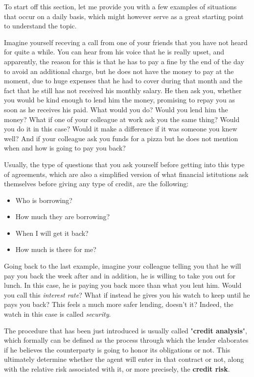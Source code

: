 \documentclass[a4paper,12pt]{article}
\begin{document}
        To start off this section, let me provide you with a few examples of situations that occur on a daily basis, which
        might however serve as a great starting point to understand the topic. 
    
        Imagine yourself receving a call from one of your friends that you have not heard for quite a while. 
        You can hear from his voice that he is really upset, and apparently, the reason for this is that he has to pay a fine 
        by the end of the day to avoid an additional charge, but he does not have the money to pay at the moment, 
        due to huge expenses that he had to cover during that month and the fact that he still has not received his monthly salary. 
        He then ask you, whether you would be kind enough to lend him the money, promising to repay you as soon as he receives his paid.
        What would you do? Would you lend him the money? What if one of your colleague at work ask you the same thing? Would you do it in this case? 
        Would it make a difference if it was someone you knew well? And if your colleague ask you funds for a pizza but he does not mention when and 
        how is going to pay you back? 
    
        Usually, the type of questions that you ask yourself before getting into this type of agreements, which are also a simplified
        version of what financial istitutions ask themselves before giving any type of credit, are the following: 

        \begin{itemize}
            \item Who is borrowing?
            \item How much they are borrowing?
            \item When I will get it back?
            \item How much is there for me?
        \end{itemize}

        Going back to the last example, imagine your colleague telling you that he will pay you back the week after and in addition, he is willing
        to take you out for lunch. In this case, he is paying you back more than what you lent him. Would you call this \textit{interest rate}? 
        What if instead he gives you his watch to keep until he pays you back? This feels a much more safer lending, doesn't it? Indeed, the watch
        in this case is called \textit{security}.

        The procedure that has been just introduced is usually called "\textbf{credit analysis}", which formally can be defined as the process through
        which the lender elaborates if he believes the counterparty is going to honor its obligations or not. This ultimately determine whether
        the agent will enter in that contract or not, along with the relative risk associated with it, or more precisely, the \textbf{credit risk}.
\end{document}
